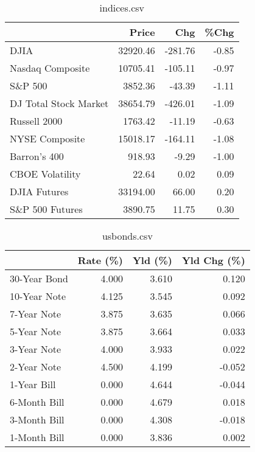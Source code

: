 \documentclass{article}%
\begin{document}
%


\begin{table}[htbp]%
\caption{indices.csv}%
\centering%
\begin{adjustbox}{width=1\textwidth}%
\begin{tabular}{lrrr}
\toprule
                      &    Price &     Chg &  \%Chg \\
\midrule
                 DJIA & 32920.46 & -281.76 & -0.85 \\
     Nasdaq Composite & 10705.41 & -105.11 & -0.97 \\
              S\&P 500 &  3852.36 &  -43.39 & -1.11 \\
DJ Total Stock Market & 38654.79 & -426.01 & -1.09 \\
         Russell 2000 &  1763.42 &  -11.19 & -0.63 \\
       NYSE Composite & 15018.17 & -164.11 & -1.08 \\
         Barron's 400 &   918.93 &   -9.29 & -1.00 \\
      CBOE Volatility &    22.64 &    0.02 &  0.09 \\
         DJIA Futures & 33194.00 &   66.00 &  0.20 \\
      S\&P 500 Futures &  3890.75 &   11.75 &  0.30 \\
\bottomrule
\end{tabular}
%
\end{adjustbox}%
\end{table}

%


\begin{table}[htbp]%
\caption{usbonds.csv}%
\centering%
\begin{adjustbox}{width=1\textwidth}%
\begin{tabular}{lrrr}
\toprule
             &  Rate (\%) &  Yld (\%) &  Yld Chg (\%) \\
\midrule
30-Year Bond &     4.000 &    3.610 &        0.120 \\
10-Year Note &     4.125 &    3.545 &        0.092 \\
 7-Year Note &     3.875 &    3.635 &        0.066 \\
 5-Year Note &     3.875 &    3.664 &        0.033 \\
 3-Year Note &     4.000 &    3.933 &        0.022 \\
 2-Year Note &     4.500 &    4.199 &       -0.052 \\
 1-Year Bill &     0.000 &    4.644 &       -0.044 \\
6-Month Bill &     0.000 &    4.679 &        0.018 \\
3-Month Bill &     0.000 &    4.308 &       -0.018 \\
1-Month Bill &     0.000 &    3.836 &        0.002 \\
\bottomrule
\end{tabular}
%
\end{adjustbox}%
\end{table}
\end{document}
